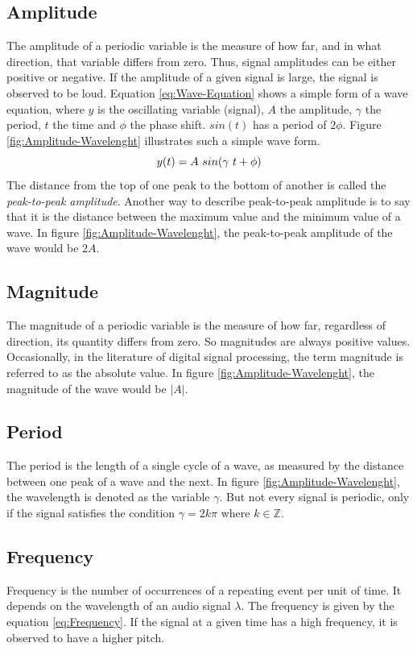 \subsection{Amplitude}
\label{sub:Amplitude}
The amplitude of a periodic variable is the measure of how far, and in what direction, that variable differs from zero. Thus, signal amplitudes can be either positive or negative. If the amplitude of a given signal is large, the signal is observed to be loud. Equation \ref{eq:Wave-Equation} shows a simple form of a wave equation, where $y$ is the oscillating variable (signal), $A$ the amplitude, $\gamma$ the period, $t$ the time and $\phi$ the phase shift. $sin(t)$ has a period of $2 \phi$. Figure \ref{fig:Amplitude-Wavelenght} illustrates such a simple wave form. 
\begin{equation}
    \centering
    y(t) = A \ sin(\gamma \ t + \phi)
    \label{eq:Wave-Equation}
\end{equation}
The distance from the top of one peak to the bottom of another is called the \textit{peak-to-peak amplitude}. Another way to describe peak-to-peak amplitude is to say that it is the distance between the maximum value and the minimum value of a wave. In figure \ref{fig:Amplitude-Wavelenght}, the peak-to-peak amplitude of the wave would be $2A$.

\subsection{Magnitude}
\label{sub:Magnitude}
The magnitude of a periodic variable is the measure of how far, regardless of direction, its quantity differs from zero. So magnitudes are always positive values. Occasionally, in the literature of digital signal processing, the term magnitude is referred to as the absolute value. In figure \ref{fig:Amplitude-Wavelenght}, the magnitude of the wave would be $|A|$.

\subsection{Period}
\label{sub:Period}
The period is the length of a single cycle of a wave, as measured by the distance between one peak of a wave and the next. In figure \ref{fig:Amplitude-Wavelenght}, the wavelength is denoted as the variable $\gamma$. But not every signal is periodic, only if the signal satisfies the condition $\gamma = 2k\pi$ where $k \in \mathbb{Z}$.

\subsection{Frequency}
\label{sub:Frequency}
Frequency is the number of occurrences of a repeating event per unit of time. It depends on the wavelength of an audio signal $\lambda$. The frequency is given by the equation \ref{eq:Frequency}. If the signal at a given time has a high frequency, it is observed to have a higher pitch.

